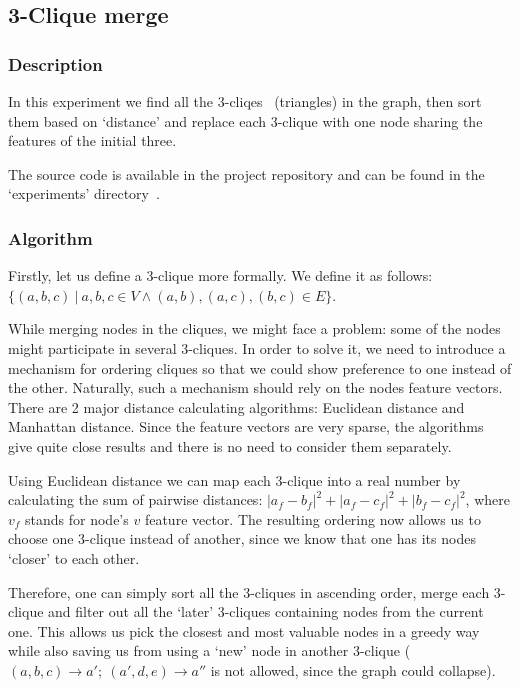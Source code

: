 \newcommand\abs[1]{\ensuremath{\lvert #1 \rvert}}

\subsection{3-Clique merge}

\subsubsection*{Description}

In this experiment we find all the 3-cliqes~\cite{wiki_clique} (triangles) in the graph, then sort them based on `distance' and replace each 3-clique with one node sharing the features of the initial three.

The source code is available in the project repository and can be found in the `experiments' directory~\cite{3clique_experiment}.

\subsubsection*{Algorithm}

Firstly, let us define a 3-clique more formally.
We define it as follows: $
\{ \left(a, b, c\right)\ 
\lvert\ a, b, c \in V \wedge
\left(a, b\right),
\left(a, c\right),
\left(b, c\right) \in E \} $.

While merging nodes in the cliques, we might face a problem: some of the nodes might participate in several 3-cliques.
In order to solve it, we need to introduce a mechanism for ordering cliques so that we could show preference to one instead of the other.
Naturally, such a mechanism should rely on the nodes feature vectors.
There are 2 major distance calculating algorithms: Euclidean distance and Manhattan distance.
Since the feature vectors are very sparse, the algorithms give quite close results and there is no need to consider them separately.

Using Euclidean distance we can map each 3-clique into a real number by calculating the sum of pairwise distances: $\abs{a_f - b_f}^2 + \abs{a_f - c_f}^2 + \abs{b_f - c_f}^2$, where $v_f$ stands for node's $v$ feature vector.
The resulting ordering now allows us to choose one 3-clique instead of another, since we know that one has its nodes `closer' to each other.

Therefore, one can simply sort all the 3-cliques in ascending order, merge each 3-clique and filter out all the `later' 3-cliques containing nodes from the current one.
This allows us pick the closest and most valuable nodes in a greedy way while also saving us from using a `new' node in another 3-clique ($(a, b, c) \rightarrow a';\ (a', d, e) \rightarrow a''$ is not allowed, since the graph could collapse).

